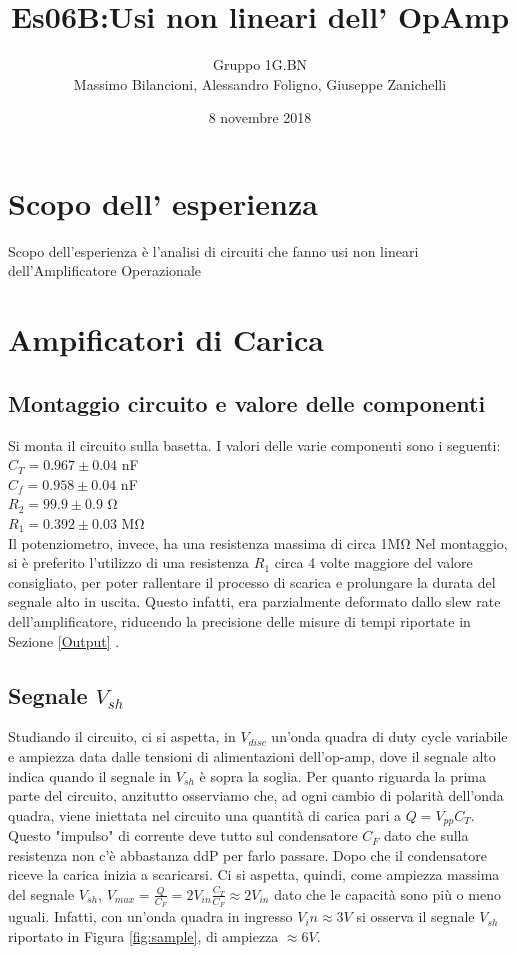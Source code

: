 \documentclass[10pt,a4paper]{article}
\author{Gruppo 1G.BN \\ Massimo Bilancioni, Alessandro Foligno, Giuseppe Zanichelli }
\title{Es06B:Usi non lineari dell’ OpAmp }
\begin{document}
	\date{8 novembre 2018}
	\maketitle
	
	
	\section*{Scopo dell' esperienza}
	Scopo dell'esperienza è l'analisi di circuiti che fanno usi non lineari dell'Amplificatore Operazionale




\section{Ampificatori di Carica}
	\subsection{Montaggio circuito e valore delle componenti}
		Si monta il circuito sulla basetta.
		I valori delle varie componenti sono i seguenti:
		\\$C_T=0.967\pm 0.04$ \si{\nano\farad}\\$C_f=0.958\pm 0.04$ \si{\nano\farad}\\$R_2=99.9\pm 0.9 $ \si{\ohm}\\$R_1=0.392 \pm0.03   $ \si{\mega \ohm}\\
				Il potenziometro, invece, ha una resistenza massima di circa 1\si{\mega\ohm}
		Nel montaggio, si è preferito l'utilizzo di una resistenza $R_1$ circa 4 volte maggiore del valore consigliato, per poter rallentare il processo di scarica e prolungare la durata del segnale alto in uscita.
		Questo infatti, era parzialmente deformato dallo slew rate dell'amplificatore, riducendo la precisione delle misure di tempi riportate in Sezione \ref{Output} .
	\subsection{Segnale $V_{sh}$}
		Studiando il circuito, ci si aspetta, in $V_{disc}$ un'onda quadra di duty cycle variabile e ampiezza data dalle tensioni di alimentazioni dell'op-amp, dove il segnale alto indica quando il segnale in $V_{sh}$ è sopra la soglia.
		Per quanto riguarda la prima parte del circuito, anzitutto osserviamo che, ad ogni cambio di polarità dell'onda quadra, viene iniettata nel circuito una quantità di carica pari a $Q=V_{pp} C_T$. Questo "impulso" di corrente deve tutto sul condensatore $C_F$ dato che sulla resistenza non c'è abbastanza ddP per farlo passare.
		Dopo che il condensatore riceve la carica inizia a scaricarsi. Ci si aspetta, quindi, come ampiezza massima del segnale $V_{sh}$, $V_{max}=\frac{Q}{C_F}=2 V_{in} \frac{C_T}{C_F}\approx 2 V_{in} $ dato che le capacità sono più o meno uguali. Infatti, con un'onda quadra in ingresso $V_in\approx3V$ si osserva il segnale $V_{sh}$ riportato in Figura \ref{fig:sample}, di ampiezza $\approx 6V$.
		
\end{document}

